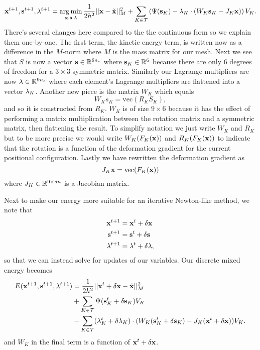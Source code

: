 \begin{equation}
\mathbf{x}^{t+1}, \mathbf{s}^{t+1}, \mathbf{\lambda}^{t+1} = \operatorname*{arg\,min}_{\mathbf{x},\mathbf{s},\mathbf{\lambda}} \frac{1}{2h^2}||\mathbf{x} - \tilde{\mathbf{x}}||_M^2 
+ \sum_{K \in \mathcal{T}} \left( \Psi(\mathbf{s}_K) - \mathbf{\lambda}_K \cdot (W_K \mathbf{s}_K - J_K \mathbf{x}) \right) V_K.
\end{equation}
There's several changes here compared to the the continuous form so we explain them one-by-one. The first term, the kinetic energy term, is written now as a difference in the $M$-norm where $M$ is the mass matrix for our mesh. Next we see that $S$ is now a vector $\mathbf{s} \in \mathbb{R}^{6n_e}$ where $\mathbf{s}_K \in \mathbb{R}^6$ because there are only 6 degrees of freedom for a $3 \times 3$ symmetric matrix. Similarly our Lagrange multipliers are now $\mathbf{\lambda} \in \mathbb{R}^{9n_e}$ where each element's Lagrange multipliers are flattened into a vector $\mathbf{\lambda}_K$. Another new piece is the matrix $W_K$ which equals
\begin{equation}
W_K s_K = \text{vec}(R_K S_K),
\end{equation}
and so it is constructed from $R_K$. $W_K$ is of size $9 \times 6$ because it has the effect of performing a matrix multiplication between the rotation matrix and a symmetric matrix, then flattening the result. To simplify notation we just write $W_K$ and $R_K$ but to be more precise we would write $W_K(F_K(\mathbf{x}))$ and $R_K(F_K(\mathbf{x}))$ to indicate that the rotation is a function of the deformation gradient for the current positional configuration.  Lastly we have rewritten the deformation gradient as
\begin{equation}
J_K \mathbf{x} = \text{vec}(F_K(\mathbf{x}))
\end{equation}
where $J_K \in \mathbb{R}^{9 \times dn}$ is a Jacobian matrix. 

Next to make our energy more suitable for an iterative Newton-like method, we note that
\begin{align*}
\mathbf{x}^{t+1} &= \mathbf{x}^t + \delta \mathbf{x} \\
\mathbf{s}^{t+1} &= \mathbf{s}^t + \delta \mathbf{s} \\
\mathbf{\lambda}^{t+1} &= \mathbf{\lambda}^t + \delta \mathbf{\lambda},
\end{align*}
so that we can instead solve for updates of our variables. Our discrete mixed energy becomes
\begin{equation}
\begin{split}
E(\mathbf{x}^{t+1}, \mathbf{s}^{t+1}, \mathbf{\lambda}^{t+1}) &= \frac{1}{2h^2}||\mathbf{x}^t + \delta \mathbf{x} - \tilde{\mathbf{x}}||_M^2 \\
&+ \sum_{K \in \mathcal{T}} \Psi(\mathbf{s}_K^t + \delta \mathbf{s}_K) V_K  \\
&-  \sum_{K \in \mathcal{T}} (\mathbf{\lambda}_K^t + \delta \mathbf{\lambda}_K) \cdot (W_K (\mathbf{s}_K^t + \delta \mathbf{s}_K) - J_K(\mathbf{x}^t + \delta \mathbf{x})) V_K.
\end{split}
\end{equation}
and $W_K$ in the final term is a function of $\mathbf{x}^t + \delta \mathbf{x}$. 

